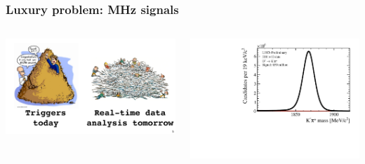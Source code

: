 \documentclass[table,xcolor=dvipsnames,professionalfonts]{beamer}
\begin{document}
\begin{frame}[t]
  \frametitle{Luxury problem: MHz signals}
  \begin{columns}\begin{column}{.6\textwidth}
  \includegraphics[width=\textwidth]{./pile.pdf}
  \end{column}\begin{column}{.4\textwidth}
  \includegraphics[height=\textwidth,angle =-90]{./Dmass.pdf}
\end{column}\end{columns}
\end{frame}
\end{document}
